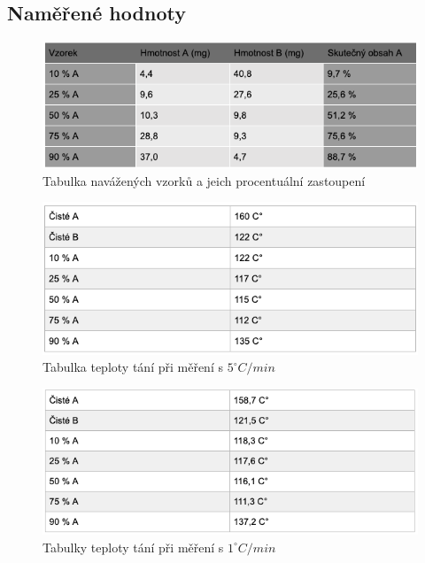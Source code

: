\documentclass[13pt, a4paper, twoside]{article}
\begin{document}
\begin{enumerate}
\section*{Naměřené hodnoty}
\begin{figure}[H]
    \centering
    \includegraphics[width=7in]{uloha_4_tab_1.png}
    \caption*{Tabulka navážených vzorků a jeich procentuální zastoupení}
\end{figure}



\begin{figure}[H]
    \centering
    \includegraphics[width=7in]{uloha_4_tab_2.png}
    \caption*{Tabulka teploty tání při měření s $5^{\circ}C/min$}
\end{figure}

\begin{figure}[H]
    \centering
    \includegraphics[width=7in]{uloha_4_tab_3.png}
    \caption*{Tabulky teploty tání při měření s $1^{\circ}C/min$}
\end{figure}


\end{enumerate}
\end{document}
